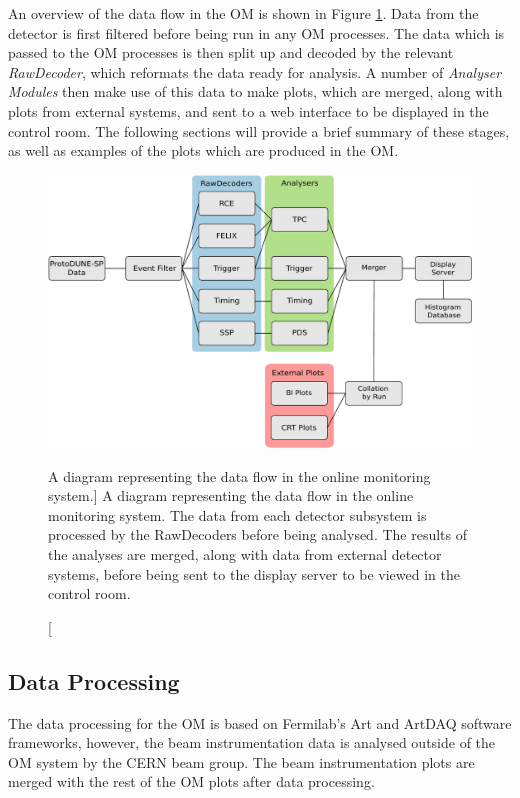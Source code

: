An overview of the data flow in the OM is shown in Figure \ref{fig:om_flow}. 
Data from the detector is first filtered before being run in any OM processes. 
The data which is passed to the OM processes is then split up and decoded by 
the relevant \emph{RawDecoder}, which reformats the data ready for analysis. A 
number of \emph{Analyser Modules} then make use of this data to make plots, 
which are merged, along with plots from external systems, and sent to a web 
interface to be displayed in the control room. The following sections will 
provide a brief summary of these stages, as well as examples of the plots 
which are produced in the OM.

\begin{figure}
	\centering
	\includegraphics[width=\textwidth]{figures/om_flow.pdf}
	\caption
	[A diagram representing the data flow in the \protodune{} online monitoring system.]
	{A diagram representing the data flow in the \protodune{} online monitoring
	system. The data from each detector subsystem is processed by the RawDecoders
	before being analysed. The results of the analyses are merged, along with data
	from external detector systems, before being sent to the display server to be
	viewed in the control room.}
	\label{fig:om_flow}
\end{figure}

\subsection{Data Processing}
The data processing for the OM is based on Fermilab's Art and ArtDAQ software
frameworks\cite{Green:2012gv, 6495515}, however, the beam instrumentation data 
is analysed outside of the OM system by the CERN beam group. The beam 
instrumentation plots are merged with the rest of the OM plots after data 
processing.


